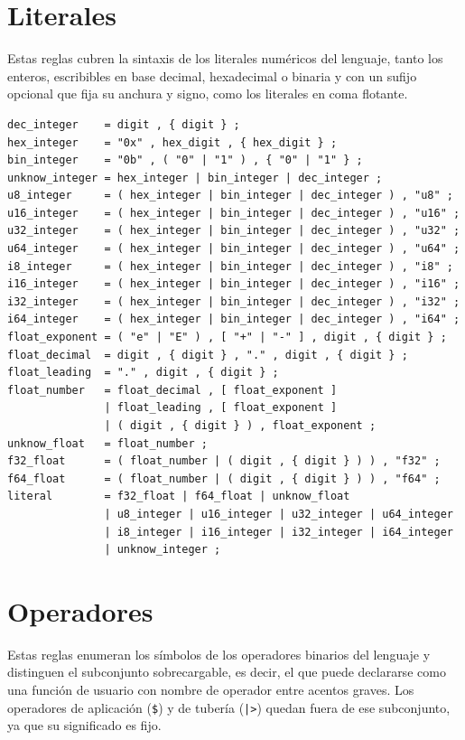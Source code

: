 \section{Literales}
\label{sec:ebnf-literales}

Estas reglas cubren la sintaxis de los literales numéricos del lenguaje, tanto los enteros, escribibles en base decimal, hexadecimal o binaria y con un sufijo opcional que fija su anchura y signo, como los literales en coma flotante.

\begin{lstlisting}[language={}, caption=Reglas de literales numéricos]
dec_integer    = digit , { digit } ;
hex_integer    = "0x" , hex_digit , { hex_digit } ;
bin_integer    = "0b" , ( "0" | "1" ) , { "0" | "1" } ;
unknow_integer = hex_integer | bin_integer | dec_integer ;
u8_integer     = ( hex_integer | bin_integer | dec_integer ) , "u8" ;
u16_integer    = ( hex_integer | bin_integer | dec_integer ) , "u16" ;
u32_integer    = ( hex_integer | bin_integer | dec_integer ) , "u32" ;
u64_integer    = ( hex_integer | bin_integer | dec_integer ) , "u64" ;
i8_integer     = ( hex_integer | bin_integer | dec_integer ) , "i8" ;
i16_integer    = ( hex_integer | bin_integer | dec_integer ) , "i16" ;
i32_integer    = ( hex_integer | bin_integer | dec_integer ) , "i32" ;
i64_integer    = ( hex_integer | bin_integer | dec_integer ) , "i64" ;
float_exponent = ( "e" | "E" ) , [ "+" | "-" ] , digit , { digit } ;
float_decimal  = digit , { digit } , "." , digit , { digit } ;
float_leading  = "." , digit , { digit } ;
float_number   = float_decimal , [ float_exponent ]
               | float_leading , [ float_exponent ]
               | ( digit , { digit } ) , float_exponent ;
unknow_float   = float_number ;
f32_float      = ( float_number | ( digit , { digit } ) ) , "f32" ;
f64_float      = ( float_number | ( digit , { digit } ) ) , "f64" ;
literal        = f32_float | f64_float | unknow_float
               | u8_integer | u16_integer | u32_integer | u64_integer
               | i8_integer | i16_integer | i32_integer | i64_integer
               | unknow_integer ;
\end{lstlisting}

\section{Operadores}
\label{sec:ebnf-operadores}

Estas reglas enumeran los símbolos de los operadores binarios del lenguaje y distinguen el subconjunto sobrecargable, es decir, el que puede declararse como una función de usuario con nombre de operador entre acentos graves. Los operadores de aplicación (\lstinline|$|) y de tubería (\lstinline{|>}) quedan fuera de ese subconjunto, ya que su significado es fijo.

